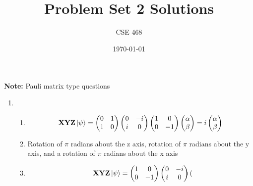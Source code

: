 \documentclass[12pt]{article}
\title{Problem Set 2 Solutions}
\author{CSE 468}
\date{\today}
\begin{document}
\maketitle

\noindent \textbf{Note:} Pauli matrix type questions

\begin{enumerate}[font=\bfseries]
    \item 
    \begin{enumerate}
        \item \[ \mathbf{X}\mathbf{Y}\mathbf{Z}\ket{\psi} = 
                \begin{pmatrix} 
                0 & 1 \\
                1 & 0
                \end{pmatrix} 
                \begin{pmatrix} 
                0 & -i \\
                i & 0
                \end{pmatrix} 
                 \begin{pmatrix} 
                1 & 0 \\
                0 & -1
                \end{pmatrix} 
                 \begin{pmatrix} 
                \alpha \\ \beta
                \end{pmatrix} 
                =
                i
                \begin{pmatrix} 
                \alpha \\ \beta
                \end{pmatrix} 
                \]
        \item Rotation of $\pi$ radians about the z axis, rotation of $\pi$ radians about the y axis, and a rotation of $\pi$ radians about the x axis
        \item \[ \mathbf{X}\mathbf{Y}\mathbf{Z}\ket{\psi} = 
                \begin{pmatrix} 
                1 & 0 \\
                0 & -1
                \end{pmatrix} 
                \begin{pmatrix} 
                0 & -i \\
                i & 0
                \end{pmatrix} 
                 \begin{pmatrix} 

\end{pmatrix}\]
\end{enumerate}
\end{enumerate}
\end{document}
